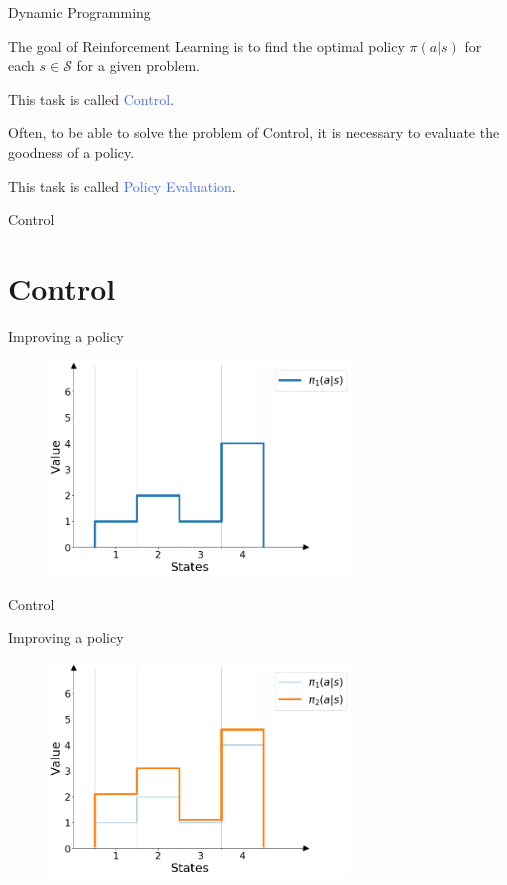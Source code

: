 \documentclass{beamer}
\begin{document}
\begin{frame}{Dynamic Programming}

The goal of Reinforcement Learning is to find the optimal policy $\pi(a|s)$ for each $s \in \mathcal{S}$ for a given problem. 

This task is called \textcolor{RoyalBlue}{Control}.

\vspace{3mm}

Often, to be able to solve the problem of Control, it is necessary to evaluate the goodness of a policy.

This task is called \textcolor{RoyalBlue}{Policy Evaluation}.

\end{frame}



\begin{frame}{Control}
\section{Control}

Improving a policy

\begin{figure}[t]
\includegraphics[width=8cm]{./images/pi1.png}
\centering
\end{figure}

\end{frame}


\begin{frame}{Control}

Improving a policy

\begin{figure}[t]
\includegraphics[width=8cm]{./images/pi2.png}
\centering
\end{figure}

\end{frame}
\end{document}
